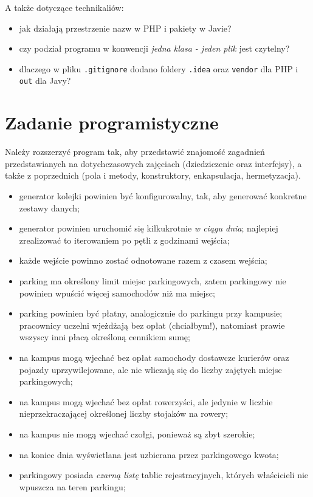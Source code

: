 \documentclass{article}
\begin{document}
	A także dotyczące technikaliów:
	\begin{itemize}
		\item jak działają przestrzenie nazw w PHP i pakiety w Javie?
		\item czy podział programu w konwencji \emph{jedna klasa - jeden plik} jest czytelny?
		\item dlaczego w pliku \texttt{.gitignore} dodano foldery \texttt{.idea} oraz \texttt{vendor} dla PHP i \texttt{out} dla Javy?
	\end{itemize}

	\section{Zadanie programistyczne}
	Należy rozszerzyć program tak, aby przedstawić znajomość zagadnień przedstawianych na dotychczasowych zajęciach (dziedziczenie oraz interfejsy), a także z poprzednich (pola i metody, konstruktory, enkapsulacja, hermetyzacja).
	
	\begin{itemize}
		\item generator kolejki powinien być konfigurowalny, tak, aby generować konkretne zestawy danych;
		\item generator powinien uruchomić się kilkukrotnie \emph{w ciągu dnia}; najlepiej zrealizować to iterowaniem po pętli z godzinami wejścia;
		\item każde wejście powinno zostać odnotowane razem z czasem wejścia;
		
		\item parking ma określony limit miejsc parkingowych, zatem parkingowy nie powinien wpuścić więcej samochodów niż ma miejsc;
		\item parking powinien być płatny, analogicznie do parkingu przy kampusie; pracownicy uczelni wjeżdżają bez opłat (chciałbym!), natomiast prawie wszyscy inni płacą określoną cennikiem sumę;
		\item na kampus mogą wjechać bez opłat samochody dostawcze kurierów oraz pojazdy uprzywilejowane, ale nie wliczają się do liczby zajętych miejsc parkingowych;
		\item na kampus mogą wjechać bez opłat rowerzyści, ale jedynie w liczbie nieprzekraczającej określonej liczby stojaków na rowery;
		\item na kampus nie mogą wjechać czołgi, ponieważ są zbyt szerokie;
		
		\item na koniec dnia wyświetlana jest uzbierana przez parkingowego kwota;
		\item parkingowy posiada \emph{czarną listę} tablic rejestracyjnych, których właścicieli nie wpuszcza na teren parkingu;
	\end{itemize}
	
\end{document}
